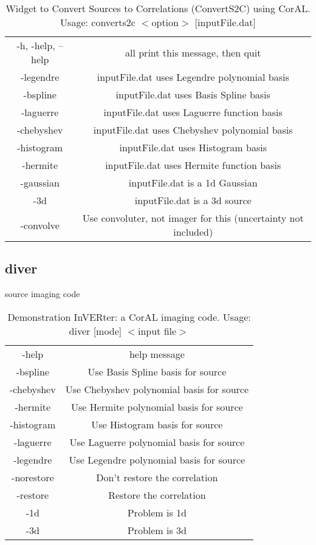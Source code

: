 \documentclass[10pt]{article}
\begin{document}
\begin{table}
\caption{Widget to Convert Sources to Correlations (ConvertS2C) using CorAL.  Usage: converts2c $<$option$>$ [inputFile.dat]}
\begin{center}
\begin{tabular}{|c|c|}
	-h, -help, --help & all print this message, then quit\\
 	-legendre   &    inputFile.dat uses Legendre polynomial basis\\
	-bspline      &  inputFile.dat uses Basis Spline basis\\
	-laguerre     &  inputFile.dat uses Laguerre function basis\\
	-chebyshev  &    inputFile.dat uses Chebyshev polynomial basis\\
	-histogram    &  inputFile.dat uses Histogram basis\\
	-hermite      &  inputFile.dat uses Hermite function basis\\
	-gaussian    &   inputFile.dat is a 1d Gaussian\\
	-3d           &  inputFile.dat is a 3d source\\
	-convolve   &    Use convoluter, not imager for this (uncertainty not included)
\end{tabular}
\end{center}
\label{converts2cCLOptions}
\end{table}


\subsection{diver}
source imaging code

\begin{table}
\caption{Demonstration InVERter: a CorAL imaging code.  Usage:  diver [mode] $<$input file$>$}
\begin{center}
\begin{tabular}{|c|c|}
	-help & help message \\
	-bspline	& Use Basis Spline basis for source\\
	-chebyshev	& Use Chebyshev polynomial basis for source\\
	-hermite	& Use Hermite polynomial basis for source\\
	-histogram	& Use Histogram basis for source\\
	-laguerre	& Use Laguerre polynomial basis for source\\
	-legendre	& Use Legendre polynomial basis for source\\
	-norestore	& Don't restore the correlation\\
	-restore	& Restore the correlation\\
	-1d	& Problem is 1d\\
	-3d	& Problem is 3d
\end{tabular}
\end{center}
\label{default}
\end{table}%
\end{document}

